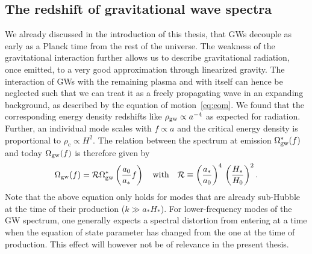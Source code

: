 \subsection{The redshift of gravitational wave spectra} \label{sec:propagation}

We already discussed in the introduction of this thesis, that \acp{GW} decouple as early as a Planck time from the rest of the universe. The  weakness of the gravitational interaction further allows us to describe gravitational radiation, once emitted, to a very good approximation through linearized gravity. The interaction of \acp{GW} with the remaining plasma and with itself can hence be neglected such that we can treat it as a freely propagating wave in an expanding background, as described by the equation of motion~\eqref{eq:eom}. We found that the corresponding energy density redshifts like $\rho_{\text{gw}} \propto a^{-4}$ as expected for radiation. Further, an individual mode scales with $f \propto a$ and the critical energy density is proportional to $\rho_\text{c} \propto H^2$. The relation between the spectrum at emission $\Omega_{\text{gw}}^*(f)$ and today $\Omega_{\text{gw}}(f)$  is therefore given by
\begin{align}
	\Omega_{\text{gw}}(f) =  \mathcal{R} \Omega_{\text{gw}}^*\left( \frac{a_0}{a_*} f \right) \quad \text{with} \quad  \mathcal{R} \equiv \left( \frac{a_*}{a_0} \right)^4 \, \left( \frac{H_*}{H_0} \right)^2 . \label{eq:GWredshift}
\end{align}
Note that the above equation only holds for modes that  are already sub-Hubble at the time of their production ($k \gg a_* H_*$). For lower-frequency modes of the \ac{GW} spectrum, one generally expects a spectral distortion from entering at a time when the equation of state parameter has changed from the one at the time of production. This effect will however not be of relevance in the present thesis.

